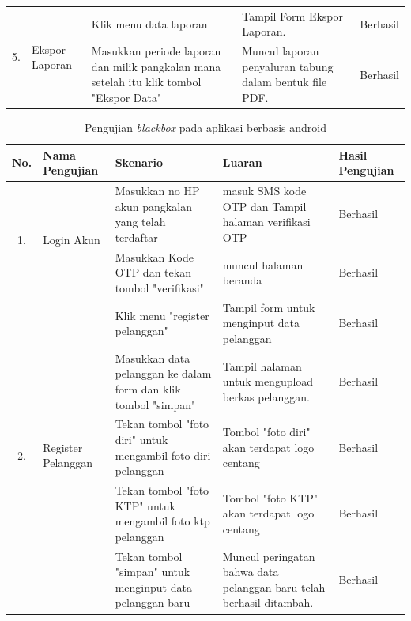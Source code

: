\begin{longtable}{ |c|p{3cm}|p{3cm}|p{3cm}|p{2cm}|}
	\multirow{2}{*}{5.}  & 	\multirow{2}{*}{Ekspor Laporan} & Klik menu data laporan          & Tampil Form Ekspor Laporan.             & Berhasil \\ \cline{3-5}
	& & Masukkan periode laporan dan milik pangkalan mana setelah itu klik tombol "Ekspor Data"     & Muncul laporan penyaluran tabung dalam bentuk file PDF.             & Berhasil \\ \hline
		
	\end{longtable}

	\pagebreak
	
	\begin{longtable}{ |c|p{3cm}|p{3cm}|p{3cm}|p{2cm}|}
		\caption{Pengujian \textit{blackbox} pada aplikasi berbasis android}
		\label{ujiMobile} \\ \hline
		\textbf{No.}                  &  \textbf{Nama Pengujian}         & \textbf{Skenario}                                       & \textbf{Luaran}              & \textbf{Hasil Pengujian} \\ \hline
		
		
		\multirow{2}{*}{1.}  & 	\multirow{2}{*}{Login Akun} & Masukkan no HP akun pangkalan yang telah terdaftar           & masuk SMS kode OTP dan  Tampil halaman verifikasi OTP         & Berhasil \\ \cline{3-5}
		& & Masukkan Kode OTP dan tekan tombol "verifikasi"           & muncul halaman beranda         & Berhasil \\ \hline
		\multirow{5}{*}{2.}  & 	\multirow{5}{*}{\parbox{3cm}{\centering Register Pelanggan}} & Klik menu "register pelanggan"           & Tampil form untuk menginput data pelanggan            & Berhasil \\ \cline{3-5}
		& & Masukkan data pelanggan ke dalam form dan klik tombol "simpan"           & Tampil halaman untuk mengupload berkas pelanggan.             & Berhasil \\ \cline{3-5}
		& &  Tekan tombol "foto diri" untuk mengambil foto diri pelanggan        & Tombol "foto diri" akan terdapat logo centang             & Berhasil \\ \cline{3-5}
		& &  Tekan tombol "foto KTP" untuk mengambil foto ktp pelanggan        & Tombol "foto KTP" akan terdapat logo centang             & Berhasil \\ \cline{3-5}
		& &  Tekan tombol "simpan" untuk menginput data pelanggan baru   & Muncul peringatan bahwa data pelanggan baru telah berhasil ditambah.             & Berhasil \\ \hline
		

\end{longtable}
